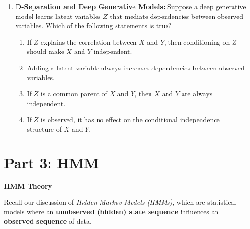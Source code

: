 \documentclass[12pt,letterpaper, onecolumn]{exam}
\begin{document}
\begin{questions}
\begin{enumerate}[label=(\alph*)]
    \item \textbf{D-Separation and Deep Generative Models:} Suppose a deep generative model learns latent variables $Z$ that mediate dependencies between observed variables. Which of the following statements is true?
    \begin{enumerate}
        \item If $Z$ explains the correlation between $X$ and $Y$, then conditioning on $Z$ should make $X$ and $Y$ independent.
        \item Adding a latent variable always increases dependencies between observed variables.
        \item If $Z$ is a common parent of $X$ and $Y$, then $X$ and $Y$ are always independent.
        \item If $Z$ is observed, it has no effect on the conditional independence structure of $X$ and $Y$.
    \end{enumerate}
\end{enumerate}

\begin{solution}
    \begin{parts}
        \part
        \part
        \part
        \part
        \part
    \end{parts}
\end{solution}


\clearpage
\section*{Part 3: HMM}
\question[20 points]\textbf{HMM Theory}\droppoints

Recall our discussion of \textit{Hidden Markov Models (HMMs)}, which are statistical models where an \textbf{unobserved (hidden) state sequence} influences an \textbf{observed sequence} of data.


\end{questions}
\end{document}
